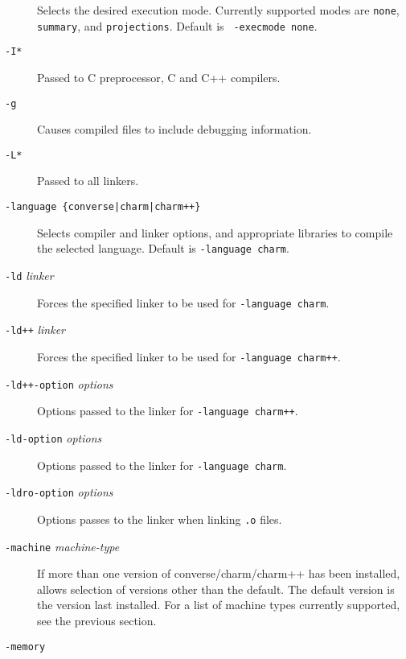 \begin{description}
Selects the desired execution mode.  Currently supported modes are
{\tt none}, {\tt summary}, and {\tt projections}. Default is {\tt
-execmode none}.

\item[{\tt -I*}]

Passed to C preprocessor, C and C++ compilers.

\item[{\tt -g}]

Causes compiled files to include debugging information.

\item[{\tt -L*}]

Passed to all linkers.

\item[{\tt -language \{converse|charm|charm++\}}]

Selects compiler and linker options, and appropriate libraries
to compile the selected language.  Default is {\tt -language charm}.

\item[{\tt -ld} {\em linker}]

Forces the specified linker to be used for {\tt -language charm}.

\item[{\tt -ld++} {\em linker}]

Forces the specified linker to be used for {\tt -language charm++}.

\item[{\tt -ld++-option} {\em options}]

Options passed to the linker for {\tt -language charm++}.

\item[{\tt -ld-option} {\em options}]

Options passed to the linker for {\tt -language charm}.

\item[{\tt -ldro-option} {\em options}]

Options passes to the linker when linking {\tt .o} files.

\item[{\tt -machine} {\em machine-type}]

If more than one version of converse/charm/charm++ has been installed,
allows selection of versions other than the default.  The default
version is the version last installed. For a list of machine types
currently supported, see the previous section.

\item[{\tt -memory}]


\end{description}
